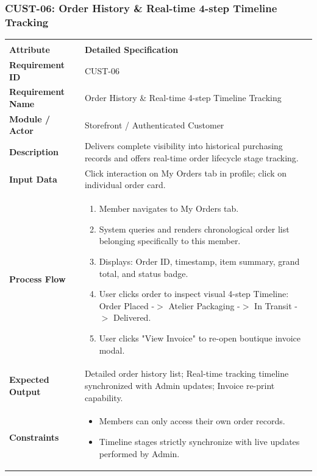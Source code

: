 \documentclass[12pt,a4paper,oneside]{report}
\begin{document}
\subsubsection{CUST-06: Order History \& Real-time 4-step Timeline Tracking}
\begin{longtable}{|p{3.6cm}|p{11.9cm}|}
\hline
\rowcolor{PrimaryBrown}
\multicolumn{2}{|p{15.5cm}|}{\textbf{\textcolor{white}{Functional Specification: CUST-06 -- Order History \& Real-time 4-step Timeline Tracking}}} \\
\hline
\endfirsthead
\hline
\rowcolor{PrimaryBrown}
\multicolumn{2}{|p{15.5cm}|}{\textbf{\textcolor{white}{Functional Specification: CUST-06 (Continued)}}} \\
\hline
\textbf{Attribute} & \textbf{Detailed Specification} \\
\hline
\endhead
\hline
\endfoot
\textbf{Requirement ID} & CUST-06 \\
\hline
\textbf{Requirement Name} & Order History \& Real-time 4-step Timeline Tracking \\
\hline
\textbf{Module / Actor} & Storefront / Authenticated Customer \\
\hline
\textbf{Description} & Delivers complete visibility into historical purchasing records and offers real-time order lifecycle stage tracking. \\
\hline
\textbf{Input Data} & Click interaction on My Orders tab in profile; click on individual order card. \\
\hline
\textbf{Process Flow} & \begin{enumerate}[leftmargin=*,nosep,topsep=2pt]
  \item Member navigates to My Orders tab.
  \item System queries and renders chronological order list belonging specifically to this member.
  \item Displays: Order ID, timestamp, item summary, grand total, and status badge.
  \item User clicks order to inspect visual 4-step Timeline: Order Placed -$>$ Atelier Packaging -$>$ In Transit -$>$ Delivered.
  \item User clicks "View Invoice" to re-open boutique invoice modal.
\end{enumerate} \\
\hline
\textbf{Expected Output} & Detailed order history list; Real-time tracking timeline synchronized with Admin updates; Invoice re-print capability. \\
\hline
\textbf{Constraints} & \begin{itemize}[leftmargin=*,nosep,topsep=2pt]
  \item Members can only access their own order records.
  \item Timeline stages strictly synchronize with live updates performed by Admin.
\end{itemize} \\
\hline
\end{longtable}
\end{document}
